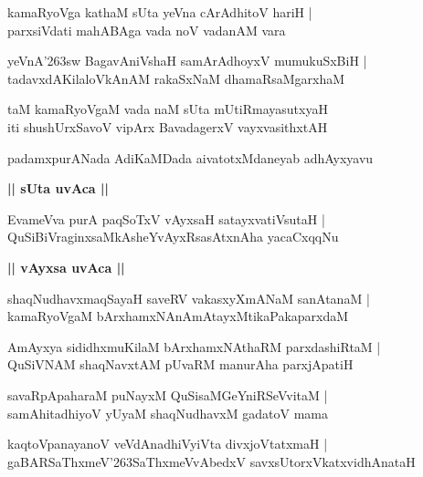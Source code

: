 \documentclass[twoside,12pt,openright]{book}
\def\S{\char'263}
\newcounter{shloka}[chapter]
\def\uvaca#1{\centerline{{\large\textbf{#1}}}}
\begin{document}
\begin{shloka}
kamaRyoVga kathaM sUta yeVna cArAdhitoV hariH |\\
parxsiVdati mahABAga vada noV vadanAM vara
\end{shloka}

\begin{shloka}
yeVnA\S sw BagavAniVshaH samArAdhoyxV mumukuSxBiH |\\
tadavxdAKilaloVkAnAM rakaSxNaM dhamaRsaMgarxhaM 
\end{shloka}

\begin{shloka}
taM kamaRyoVgaM vada naM sUta mUtiRmayasutxyaH \\
iti shushUrxSavoV vipArx BavadagerxV vayxvasithxtAH
\end{shloka}

\begin{center}
padamxpurANada AdiKaMDada aivatotxMdaneyab adhAyxyavu
\end{center}

\uvaca{|| sUta uvAca ||}

\begin{shloka}
EvameVva purA paqSoTxV vAyxsaH satayxvatiVsutaH |\\
QuSiBiVraginxsaMkAsheYvAyxRsasAtxnAha yacaCxqqNu 
\end{shloka}

\uvaca{|| vAyxsa uvAca ||}

\begin{shloka}
shaqNudhavxmaqSayaH saveRV vakasxyXmANaM sanAtanaM |\\
kamaRyoVgaM bArxhamxNAnAmAtayxMtikaPakaparxdaM 
\end{shloka}

\begin{shloka}
AmAyxya sididhxmuKilaM bArxhamxNAthaRM parxdashiRtaM |\\
QuSiVNAM shaqNavxtAM pUvaRM manurAha parxjApatiH 
\end{shloka}

\begin{shloka}
savaRpApaharaM puNayxM QuSisaMGeYniRSeVvitaM |\\
samAhitadhiyoV yUyaM shaqNudhavxM gadatoV mama
\end{shloka}

\begin{shloka}
kaqtoVpanayanoV veVdAnadhiVyiVta divxjoVtatxmaH |\\
gaBARSaThxmeV\S SaThxmeVvAbedxV savxsUtorxVkatxvidhAnataH 
\end{shloka}
\end{document}

